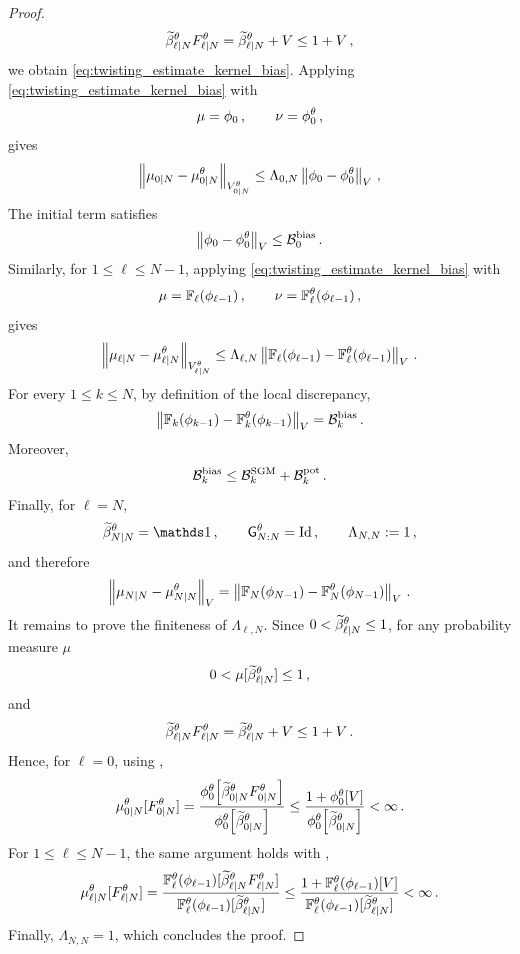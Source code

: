 \documentclass[11pt]{article}
\theoremstyle{plain}
\theoremstyle{definition}
\theoremstyle{remark}
\begin{document}
\begin{proof}
$$
\normbackwardfun{\ell}{N}[\theta]F_{\ell|N}^{\theta} = \normbackwardfun{\ell}{N}[\theta]+V \le 1+V \eqsp,
$$
we obtain \eqref{eq:twisting_estimate_kernel_bias}. Applying \eqref{eq:twisting_estimate_kernel_bias} with
$$
\mu=\filter{0} \eqsp,
\qquad
\nu=\approxfilter{0} \eqsp,
$$
gives
$$
\vnorm[ \muBias{0}{N} - \muBias{0}{N}[\theta] ][\twistedlyap{0}{N}[\theta]] \le \Lambda_{0,N} \vnorm[\filter{0}-\approxfilter{0} ][V] \eqsp,
$$
The initial term satisfies
$$
\vnorm[ \filter{0}-\approxfilter{0} ][V] \le \mathcal B_0^{\rm bias} \eqsp.
$$
Similarly, for $1\le \ell\le N-1$, applying
\eqref{eq:twisting_estimate_kernel_bias} with
$$
\mu= \filtertransform{\ell}(\filter{\ell-1}) \eqsp,
\qquad
\nu= \filtertransform{\ell}[\theta](\filter{\ell-1}) \eqsp,
$$
gives
$$
\vnorm[ \muBias{\ell}{N} - \muBias{\ell}{N}[\theta] ][\twistedlyap{\ell}{N}[\theta]] \le \Lambda_{\ell,N} \vnorm[ \filtertransform{\ell}(\filter{\ell-1}) - \filtertransform{\ell}[\theta](\filter{\ell-1})
][V] \eqsp.
$$
For every $1\le k\le N$, by definition of the local discrepancy,
$$
\vnorm[ \filtertransform{k}(\filter{k-1}) - \filtertransform{k}[\theta](\filter{k-1})
][V] = \mathcal B_k^{\rm bias} \eqsp.
$$
Moreover, 
$$
\mathcal B_k^{\rm bias} \le \mathcal B_k^{\rm SGM} + \mathcal B_k^{\rm pot} \,.
$$
Finally, for $\ell=N$,
$$
\normbackwardfun{N}{N}[\theta]=\un \eqsp, \qquad \prodfsmk{N}{N}[\theta]=\operatorname{Id} \eqsp,
\qquad \Lambda_{N,N}\eqdef1 \eqsp,
$$
and therefore
$$
\vnorm[ \muBias{N}{N} - \muBias{N}{N}[\theta] ][V] = \vnorm[ \filtertransform{N}(\filter{N-1}) - \filtertransform{N}[\theta](\filter{N-1}) ][V] \eqsp.
$$
%
It remains to prove the finiteness of $\Lambda_{\ell,N}$. Since $0<\normbackwardfun{\ell}{N}[\theta]\le1$, for any probability measure $\mu$ 
$$
0<\mu[\normbackwardfun{\ell}{N}[\theta]] \le 1 \eqsp,
$$
and
$$
\normbackwardfun{\ell}{N}[\theta]F_{\ell|N}^{\theta} = \normbackwardfun{\ell}{N}[\theta]+V \le 1+V \eqsp.
$$
Hence, for $\ell=0$, using ,
$$
\muBias{0}{N}[\theta][F_{0|N}^{\theta}] = \frac{ \approxfilter{0}[ \normbackwardfun{0}{N}[\theta]F_{0|N}^{\theta}]}{\approxfilter{0}[ \normbackwardfun{0}{N}[\theta] ] } \le \frac{ 1+\approxfilter{0}[V] }{\approxfilter{0}[\normbackwardfun{0}{N}[\theta]]} <\infty \eqsp.
$$
For $1\le \ell\le N-1$, the same argument holds with ,
$$
\muBias{\ell}{N}[\theta][F_{\ell|N}^{\theta}] = \frac{ \filtertransform{\ell}[\theta](\filter{\ell-1}) [ \normbackwardfun{\ell}{N}[\theta]F_{\ell|N}^{\theta}] }{ \filtertransform{\ell}[\theta](\filter{\ell-1}) [\normbackwardfun{\ell}{N}[\theta] ] } \le \frac{ 1+\filtertransform{\ell}[\theta](\filter{\ell-1})[V] }{ \filtertransform{\ell}[\theta](\filter{\ell-1}) [\normbackwardfun{\ell}{N}[\theta] ] } < \infty \eqsp . 
$$
Finally, $\Lambda_{N,N}=1$, which concludes the proof.
\end{proof}
\end{document}
